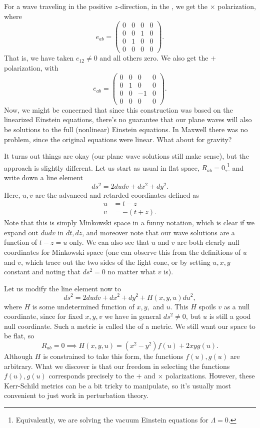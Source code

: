 For a wave traveling in the positive $z$-direction, in the , we get the $\times$ polarization, where
$$e_{ab}=\begin{pmatrix}
0&0&0&0\\
0&0&1&0\\
0&1&0&0\\
0&0&0&0
\end{pmatrix}.$$
That is, we have taken $e_{12}\neq 0$ and all others zero. We also get the $+$ polarization, with
$$e_{ab}=\begin{pmatrix}
0&0&0&0\\
0&1&0&0\\
0&0&-1&0\\
0&0&0&0
\end{pmatrix}.$$
Now, we might be concerned that since this construction was based on the linearized Einstein equations, there's no guarantee that our plane waves will also be solutions to the full (nonlinear) Einstein equations. In Maxwell there was no problem, since the original equations were linear. What about for gravity?

It turns out things are okay (our plane wave solutions still make sense), but the approach is slightly different. Let us start as usual in flat space, $R_{ab}=0$,\footnote{Equivalently, we are solving the vacuum Einstein equations for $\Lambda=0$.} and write down a line element
\begin{equation}
    ds^2=2dudv + dx^2+dy^2.
\end{equation}
Here, $u,v$ are the advanced and retarded coordinates defined as
\begin{align*}
    u&= t-z\\
    v&=-(t+z).
\end{align*}
Note that this is simply Minkowski space in a funny notation, which is clear if we expand out $dudv$ in $dt,dz$, and moreover note that our wave solutions are a function of $t-z=u$ only. We can also see that $u$ and $v$ are both clearly null coordinates for Minkowski space (one can observe this from the definitions of $u$ and $v$, which trace out the two sides of the light cone, or by setting $u,x,y$ constant and noting that $ds^2=0$ no matter what $v$ is). 

Let us modify the line element now to
$$ds^2=2dudv + dx^2+dy^2+H(x,y,u)du^2,$$
where $H$ is some undetermined function of $x,y,$ and $u$. This $H$ spoils $v$ as a null coordinate, since for fixed $x,y,v$ we have in general $ds^2\neq 0$, but $u$ is still a good null coordinate. Such a metric is called the  of a metric. We still want our space to be flat, so
$$R_{ab}=0 \implies H(x,y,u)=(x^2-y^2)f(u)+2xy g(u).$$
Although $H$ is constrained to take this form, the functions $f(u),g(u)$ are arbitrary. What we discover is that our freedom in selecting the functions $f(u),g(u)$ corresponds precisely to the $+$ and $\times$ polarizations. However, these Kerr-Schild metrics can be a bit tricky to manipulate, so it's usually most convenient to just work in perturbation theory.

